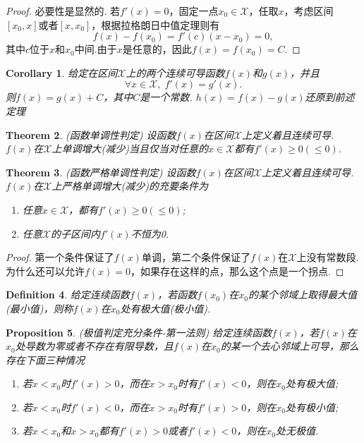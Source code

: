 \documentclass{article}
\newtheorem{theorem}{Theorem}[section]
\newtheorem{corollary}[theorem]{Corollary}
\newtheorem{proposition}[theorem]{Proposition}
\newtheorem{definition}[theorem]{Definition}
\begin{document}
\begin{proof}
\rm 必要性是显然的. 若$f'(x)=0$，固定一点$x_0 \in \mathcal{X}$，任取$x$，考虑区间$[x_0,x]$或者$[x,x_0]$，根据拉格朗日中值定理则有
$$
f(x)-f(x_0) =f'(c)(x-x_0) = 0,
$$
其中$c$位于$x$和$x_0$中间.由于$x$是任意的，因此$f(x)=f(x_0)=C$. 
\end{proof}

\begin{corollary}
\rm 给定在区间$\mathcal{X}$上的两个连续可导函数$f(x)$和$g(x)$，并且
$$
\forall x \in \mathcal{X},\;f'(x) = g'(x).
$$
则$f(x) = g(x) + C$，其中$C$是一个常数. {\color{red} $h(x) = f(x) - g(x)$还原到前述定理}
\end{corollary}


\begin{theorem}
\rm {\color{red} (函数单调性判定)} 设函数$f(x)$在区间$\mathcal{X}$上定义着且连续可导. $f(x)$在$\mathcal{X}$上单调增大(减少)当且仅当对任意的$x \in \mathcal{X}$都有$f'(x) \geq 0(\leq 0)$.
\end{theorem}

\begin{theorem}
\rm {\color{red} (函数严格单调性判定)} 设函数$f(x)$在区间$\mathcal{X}$上定义着且连续可导. $f(x)$在$\mathcal{X}$上{\color{red}严格单调}增大(减少)的充要条件为
\begin{enumerate}
	\item 任意$x \in \mathcal{X}$，都有$f'(x) \geq 0(\leq 0)$;
	\item 任意$\mathcal{X}$的子区间内$f'(x)$不恒为0.
\end{enumerate}
\end{theorem}

\begin{proof}
{\color{blue}第一个条件保证了$f(x)$单调，第二个条件保证了$f(x)$在$\mathcal{X}$上没有常数段. 为什么还可以允许$f(x)=0$，如果存在这样的点，那么这个点是一个拐点}.
\end{proof}

\begin{definition}
\rm 给定连续函数$f(x)$，若函数$f(x_0)$在$x_0$的某个邻域上取得最大值(最小值)，则称$f(x)$在$x_0$处有{\color{red}极大值(极小值)}.
\end{definition}

\begin{proposition}
\rm {\color{red} (极值判定充分条件-第一法则)} \rm 给定连续函数$f(x)$，若$f(x)$在$x_0$处导数为零或者不存在有限导数，且$f(x)$在$x_0$的某一个去心邻域上可导，那么存在下面三种情况
\begin{enumerate}
	\item 若$x < x_0$时$f'(x) > 0$，而在$x > x_0$时有$f'(x) < 0$，则在$x_0$处有极大值;
	\item 若$x < x_0$时$f'(x) < 0$，而在$x > x_0$时有$f'(x) > 0$，则在$x_0$处有极小值;
	\item 若$x < x_0$和$x > x_0$都有$f'(x) > 0$或者$f'(x) < 0$，则在$x_0$处无极值.
\end{enumerate}
\end{proposition}
\end{document}
